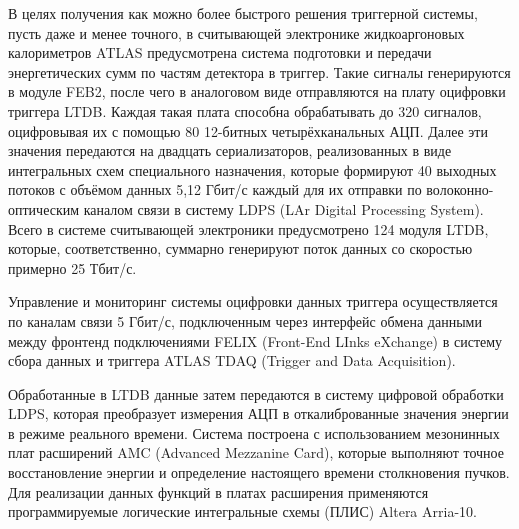 В целях получения как можно более быстрого решения триггерной системы, пусть даже и менее точного, в считывающей электронике жидкоаргоновых калориметров ATLAS предусмотрена система подготовки и передачи энергетических сумм по частям детектора в триггер. Такие сигналы генерируются в модуле FEB2, после чего в аналоговом виде отправляются на плату оцифровки триггера LTDB. Каждая такая плата способна обрабатывать до 320 сигналов, оцифровывая их с помощью 80 12-битных четырёхканальных АЦП\parencite{ltdb}. Далее эти значения передаются на двадцать сериализаторов, реализованных в виде интегральных схем специального назначения, которые формируют 40 выходных потоков с объёмом данных 5,12 Гбит/с каждый для их отправки по волоконно-оптическим каналом связи в систему LDPS (LAr Digital Processing System). Всего в системе считывающей электроники предусмотрено 124 модуля LTDB, которые, соответственно, суммарно генерируют поток данных со скоростью примерно 25 Тбит/с.\par
Управление и мониторинг системы оцифровки данных триггера осуществляется по каналам связи 5 Гбит/с, подключенным через интерфейс обмена данными между фронтенд подключениями FELIX (Front-End LInks eXchange) в систему сбора данных и триггера ATLAS TDAQ (Trigger and Data Acquisition).\par
Обработанные в LTDB данные затем передаются в систему цифровой обработки LDPS, которая преобразует измерения АЦП в откалиброванные значения энергии в режиме реального времени. Система построена с использованием мезонинных плат расширений AMC (Advanced Mezzanine Card), которые выполняют точное восстановление энергии и определение настоящего времени столкновения пучков. Для реализации данных функций в платах расширения применяются программируемые логические интегральные схемы (ПЛИС) Altera Arria-10.\par
